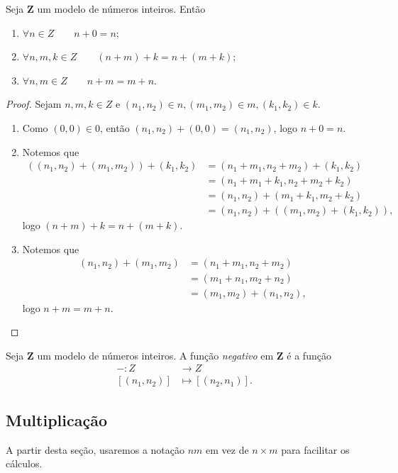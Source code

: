 \begin{prop}
	Seja $\bm Z$ um modelo de números inteiros. Então
	\begin{enumerate}
	\item $\forall n \in Z \qquad n+0=n$;
	\item $\forall n,m,k \in Z \qquad (n+m)+k=n+(m+k)$;
	\item $\forall n,m \in Z \qquad n+m=m+n$.
	\end{enumerate}
\end{prop}
\begin{proof} Sejam $n,m,k \in Z$ e $(n_1,n_2) \in n,(m_1,m_2) \in m,(k_1,k_2) \in k$.
	\begin{enumerate}
	\item Como $(0,0) \in 0$, então $(n_1,n_2)+(0,0)=(n_1,n_2)$, logo $n+0=n$.
	
	\item Notemos que
	\begin{align*}
	((n_1,n_2)+(m_1,m_2))+(k_1,k_2) &= (n_1+m_1,n_2+m_2)+(k_1,k_2) \\
		&= (n_1+m_1+k_1,n_2+m_2+k_2) \\
		&= (n_1,n_2) +(m_1+k_1,m_2+k_2) \\
		&= (n_1,n_2) +((m_1,m_2)+(k_1,k_2)),
	\end{align*}
logo $(n+m)+k=n+(m+k)$.

	\item Notemos que
	\begin{align*}
	(n_1,n_2)+(m_1,m_2) &= (n_1+m_1,n_2+m_2) \\
	&= (m_1+n_1,m_2+n_2) \\
	&= (m_1,m_2) +(n_1,n_2),
	\end{align*}
logo $n+m=m+n$.
	\end{enumerate}
\end{proof}

\begin{defi}
	Seja $\bm Z$ um modelo de números inteiros. A função \emph{negativo} em $\bm Z$ é a função
	\begin{align*}
	-: Z &\to Z \\
	[(n_1,n_2)] &\mapsto [(n_2,n_1)].
	\end{align*}
\end{defi}


\subsection{Multiplicação}

A partir desta seção, usaremos a notação $nm$ em vez de $n \times m$ para facilitar os cálculos.

